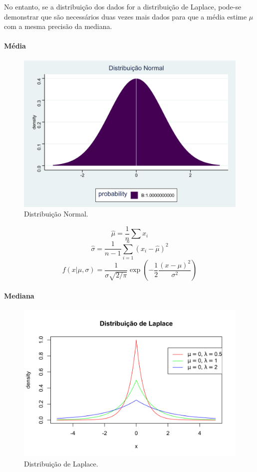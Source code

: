 \documentclass[a4paper, 12pt]{article}
\let\oldparagraph\paragraph
\renewcommand{\paragraph}[1]{\oldparagraph{#1}\mbox{}}
\begin{document}
No entanto, se a distribuição dos dados for a distribuição de Laplace,
pode-se demonstrar que são necessários duas vezes mais dados para que a
média estime \(\mu\) com a mesma precisão da mediana.

\hypertarget{media}{%
\paragraph{Média}\label{media}}

\begin{figure}[H]

{\centering \includegraphics[width=0.7\linewidth]{images/dist_normal-1} 

}

\caption{Distribuição Normal.}\label{fig:dist_normal}
\end{figure}

\[\hat \mu = \frac{1}{n}\sum x_i\]
\[\hat \sigma = \frac{1}{n-1} \sum_{i=1}^n (x_i - \hat \mu)^2\]
\[f(x|\mu, \sigma) = \frac{1}{\sigma\sqrt{2/\pi}}\exp \left (-\frac{1}{2}\frac{(x - \mu)^2}{\sigma^2} \right )\]

\hypertarget{mediana}{%
\paragraph{Mediana}\label{mediana}}

\begin{figure}[H]

{\centering \includegraphics[width=0.7\linewidth]{images/dist_Laplace-1} 

}

\caption{Distribuição de Laplace.}\label{fig:dist_Laplace}
\end{figure}
\end{document}
